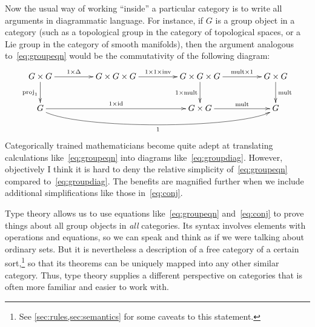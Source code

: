 \documentclass[12pt]{article}
\numberwithin{equation}{section}
\begin{document}
Now the usual way of working ``inside'' a particular category is to write all arguments in diagrammatic language.
For instance, if $G$ is a group object in a category (such as a topological group in the category of topological spaces, or a Lie group in the category of smooth manifolds), then the argument analogous to~\eqref{eq:groupeqn} would be the commutativity of the following diagram:
\begin{equation}
  \vcenter{\xymatrix@C=3.8pc{
      G\times G\ar[r]^-{1\times \Delta}\ar[d]_{\mathrm{proj}_1} &
      G\times G\times G\ar[r]^-{1\times 1\times \mathrm{inv}} &
      G\times G\times G\ar[r]^-{\mathrm{mult}\times 1}\ar[d]_{1\times \mathrm{mult}} &
      G\times G\ar[d]^-{\mathrm{mult}}\\
      G\ar[rr]^-{1\times \mathrm{id}} \ar@(dr,dl)[rrr]_{1} &&
      G\times G\ar[r]^-{\mathrm{mult}} &
      G
      }}\label{eq:groupdiag}
\end{equation}
Categorically trained mathematicians become quite adept at translating calculations like~\eqref{eq:groupeqn} into diagrams like~\eqref{eq:groupdiag}.
However, objectively I think it is hard to deny the relative simplicity of~\eqref{eq:groupeqn} compared to~\eqref{eq:groupdiag}.
The benefits are magnified further when we include additional simplifications like those in~\eqref{eq:conj}.

Type theory allows us to use equations like~\eqref{eq:groupeqn} and~\eqref{eq:conj} to prove things about all group objects in \emph{all} categories.
Its syntax involves elements with operations and equations, so we can speak and think as if we were talking about ordinary sets.
But it is nevertheless a description of a free category of a certain sort,\footnote{See \cref{sec:rules,sec:semantics} for some caveats to this statement.} so that its theorems can be uniquely mapped into any other similar category.
Thus, type theory supplies a different perspective on categories that is often more familiar and easier to work with.
\end{document}
